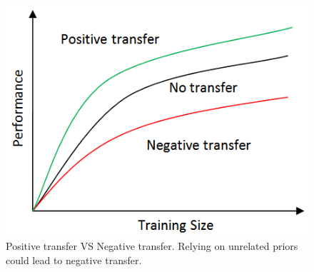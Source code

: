 
\begin{figure}
\includegraphics[scale=.6]{fig/negative.png}
\caption{Positive transfer VS Negative transfer. Relying on unrelated priors could lead to negative transfer.}
\end{figure}